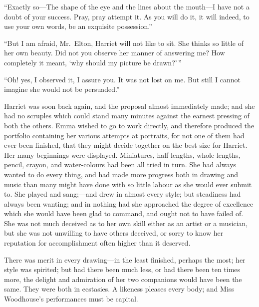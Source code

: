 ``Exactly so---The shape of the eye and the lines about the mouth---I
have not a doubt of your success.  Pray, pray attempt it.
As you will do it, it will indeed, to use your own words,
be an exquisite possession.''

``But I am afraid, Mr.\ Elton, Harriet will not like to sit.
She thinks so little of her own beauty.  Did not you observe her
manner of answering me? How completely it meant, `why should my
picture be drawn?'\,''

``Oh! yes, I observed it, I assure you.  It was not lost on me.
But still I cannot imagine she would not be persuaded.''

Harriet was soon back again, and the proposal almost immediately made;
and she had no scruples which could stand many minutes against the earnest
pressing of both the others.  Emma wished to go to work directly,
and therefore produced the portfolio containing her various attempts
at portraits, for not one of them had ever been finished, that they
might decide together on the best size for Harriet.  Her many
beginnings were displayed.  Miniatures, half-lengths, whole-lengths,
pencil, crayon, and water-colours had been all tried in turn.
She had always wanted to do every thing, and had made more progress
both in drawing and music than many might have done with so little
labour as she would ever submit to.  She played and sang;---and drew
in almost every style; but steadiness had always been wanting;
and in nothing had she approached the degree of excellence which she
would have been glad to command, and ought not to have failed of.
She was not much deceived as to her own skill either as an artist
or a musician, but she was not unwilling to have others deceived,
or sorry to know her reputation for accomplishment often higher
than it deserved.

There was merit in every drawing---in the least finished, perhaps the most;
her style was spirited; but had there been much less, or had there
been ten times more, the delight and admiration of her two companions
would have been the same.  They were both in ecstasies.  A likeness
pleases every body; and Miss Woodhouse's performances must be capital.

